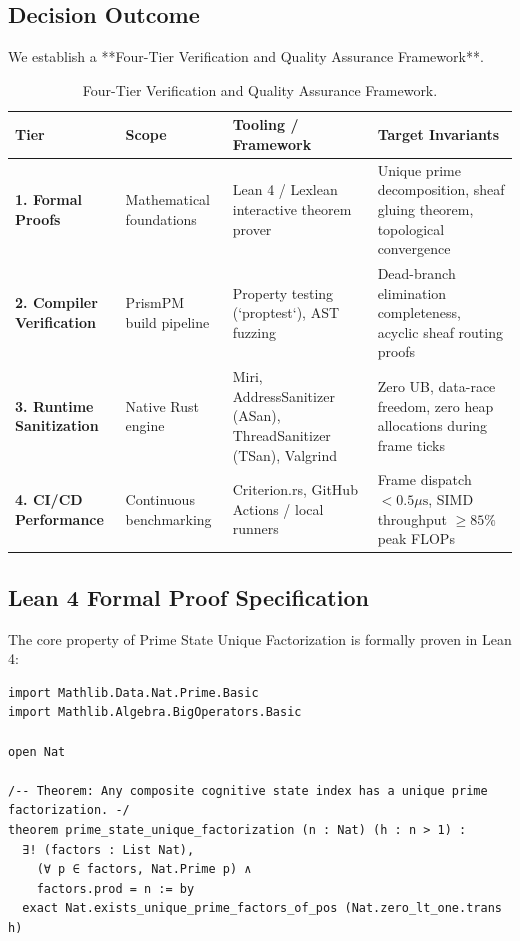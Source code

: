 \subsection{Decision Outcome}
We establish a **Four-Tier Verification and Quality Assurance Framework**.

\begin{table}[htbp]
\centering
\small
\begin{tabularx}{\textwidth}{l p{3.2cm} p{4.2cm} X}
\toprule
\textbf{Tier} & \textbf{Scope} & \textbf{Tooling / Framework} & \textbf{Target Invariants} \\
\midrule
\textbf{1. Formal Proofs} & Mathematical foundations & Lean 4 / Lexlean interactive theorem prover & Unique prime decomposition, sheaf gluing theorem, topological convergence \\
\addlinespace
\textbf{2. Compiler Verification} & PrismPM build pipeline & Property testing (`proptest`), AST fuzzing & Dead-branch elimination completeness, acyclic sheaf routing proofs \\
\addlinespace
\textbf{3. Runtime Sanitization} & Native Rust engine & Miri, AddressSanitizer (ASan), ThreadSanitizer (TSan), Valgrind & Zero UB, data-race freedom, zero heap allocations during frame ticks \\
\addlinespace
\textbf{4. CI/CD Performance} & Continuous benchmarking & Criterion.rs, GitHub Actions / local runners & Frame dispatch $< 0.5\mu\text{s}$, SIMD throughput $\ge 85\%$ peak FLOPs \\
\bottomrule
\end{tabularx}
\caption{Four-Tier Verification and Quality Assurance Framework.}
\label{tab:qa_framework}
\end{table}

\subsection{Lean 4 Formal Proof Specification}
The core property of Prime State Unique Factorization is formally proven in Lean 4:

\begin{lstlisting}[language=Lexlean, caption={Lean 4 Theorem: Unique Factorization of Prime Composite States}]
import Mathlib.Data.Nat.Prime.Basic
import Mathlib.Algebra.BigOperators.Basic

open Nat

/-- Theorem: Any composite cognitive state index has a unique prime factorization. -/
theorem prime_state_unique_factorization (n : Nat) (h : n > 1) :
  ∃! (factors : List Nat),
    (∀ p ∈ factors, Nat.Prime p) ∧
    factors.prod = n := by
  exact Nat.exists_unique_prime_factors_of_pos (Nat.zero_lt_one.trans h)
\end{lstlisting}

